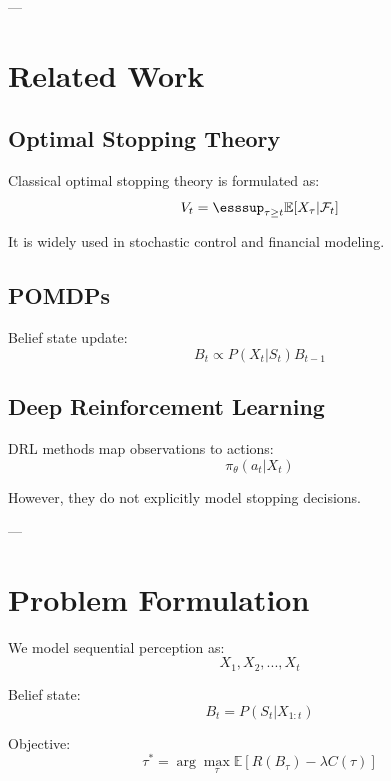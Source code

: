 \documentclass[journal]{IEEEtran}
\begin{document}
---

\section{Related Work}

\subsection{Optimal Stopping Theory}
Classical optimal stopping theory is formulated as:
\begin{equation}
V_t = \esssup_{\tau \ge t} \mathbb{E}[X_\tau | \mathcal{F}_t]
\end{equation}

It is widely used in stochastic control and financial modeling.

\subsection{POMDPs}
Belief state update:
\begin{equation}
B_t \propto P(X_t | S_t) B_{t-1}
\end{equation}

\subsection{Deep Reinforcement Learning}
DRL methods map observations to actions:
\begin{equation}
\pi_\theta(a_t | X_t)
\end{equation}

However, they do not explicitly model stopping decisions.

---

\section{Problem Formulation}

We model sequential perception as:
\begin{equation}
X_1, X_2, ..., X_t
\end{equation}

Belief state:
\begin{equation}
B_t = P(S_t | X_{1:t})
\end{equation}

Objective:
\begin{equation}
\tau^* = \arg\max_{\tau} \mathbb{E}[R(B_\tau) - \lambda C(\tau)]
\end{equation}
\end{document}
